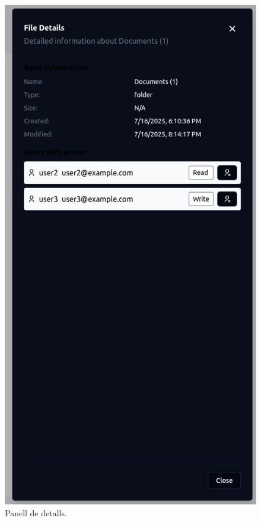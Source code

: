 \begin{figure}[H]
\begin{minipage}{0.32\textwidth}
        \includegraphics[width=\linewidth]{Figures/ui-web/file_details.png}
        \caption{Panell de detalls.}
        \label{fig:react-details-impl}
    \end{minipage}
\end{figure}

